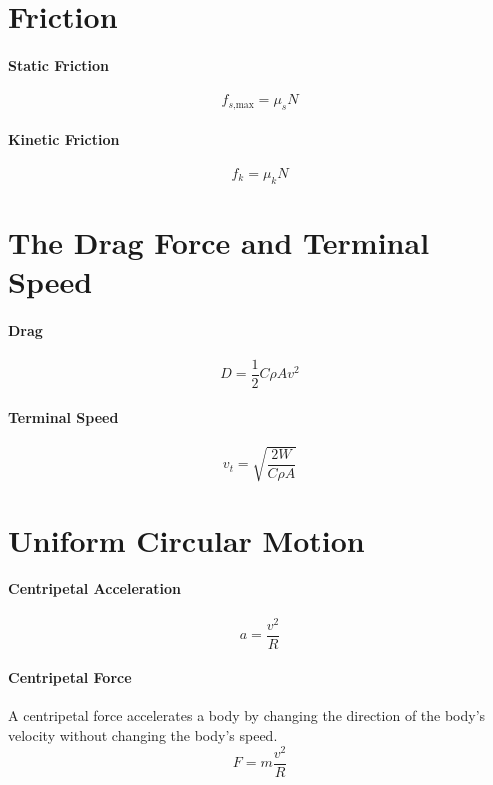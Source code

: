 \documentclass{article}
\begin{document}
    \section{Friction}

        \paragraph{Static Friction}
        \begin{equation}
            f_{s\text{,max}} = \mu_s N
        \end{equation}

        \paragraph{Kinetic Friction}
        \begin{equation}
            f_k = \mu_k N
        \end{equation}

    \section{The Drag Force and Terminal Speed}

        \paragraph{Drag}
        \begin{equation}
            D = \frac{1}{2} C \rho A v^2
        \end{equation}
        
        \paragraph{Terminal Speed}
        \begin{equation}
            v_t = \sqrt{\frac{2 W}{C \rho A}}
        \end{equation}

    \section{Uniform Circular Motion}

        \paragraph{Centripetal Acceleration}
        \begin{equation}
            a = \frac{v^2}{R}
        \end{equation}

        \paragraph{Centripetal Force}
        A centripetal force accelerates a body by changing the direction of the body's velocity without changing the body's speed.
        \begin{equation}
            F = m \frac{v^2}{R}
        \end{equation}
\end{document}
